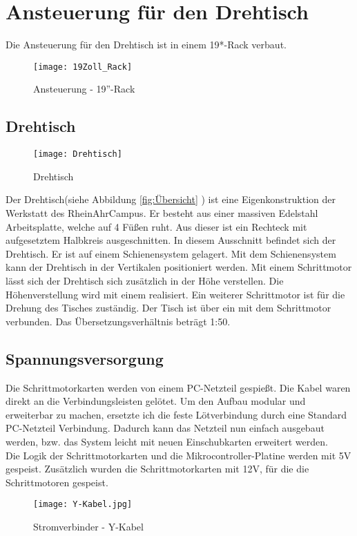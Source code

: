 \section{Ansteuerung für den Drehtisch}
Die Ansteuerung für den Drehtisch ist in einem 19*-Rack verbaut.
\begin{figure}[htb]
\centering
\texttt{[image: 19Zoll\_Rack]}
\caption{Ansteuerung - 19''-Rack}
\label{fig:19Zoll_Rack}
\end{figure}
\subsection{Drehtisch}
\begin{figure}[htb]
\centering
\texttt{[image: Drehtisch]}
\caption{Drehtisch}
\label{fig:Drehtisch}
\end{figure}
Der Drehtisch(siehe Abbildung \ref{fig:Übersicht} ) ist eine Eigenkonstruktion der Werkstatt des RheinAhrCampus. Er besteht aus einer massiven Edelstahl Arbeitsplatte, welche auf 4 Füßen ruht. Aus dieser ist ein Rechteck mit aufgesetztem Halbkreis ausgeschnitten. In diesem Ausschnitt befindet sich der Drehtisch. Er ist auf einem Schienensystem gelagert. Mit dem Schienensystem kann der Drehtisch in der Vertikalen positioniert werden. Mit einem Schrittmotor lässt sich der Drehtisch sich zusätzlich in der Höhe verstellen. Die Höhenverstellung wird mit einem  realisiert. Ein weiterer Schrittmotor ist für die Drehung des Tisches zuständig. Der Tisch ist über ein  mit dem Schrittmotor verbunden. Das Übersetzungsverhältnis beträgt 1:50.   
\subsection{Spannungsversorgung}
Die Schrittmotorkarten werden von einem PC-Netzteil gespießt. Die Kabel waren direkt an die Verbindungsleisten gelötet. Um den Aufbau modular und erweiterbar zu machen, ersetzte ich die feste Lötverbindung durch eine Standard PC-Netzteil Verbindung. Dadurch kann das Netzteil nun einfach ausgebaut werden, bzw. das System leicht mit neuen Einschubkarten erweitert werden.\\
Die Logik der Schrittmotorkarten und die Mikrocontroller-Platine werden mit 5V gespeist. Zusätzlich wurden die Schrittmotorkarten mit 12V, für die die Schrittmotoren gespeist.
\begin{figure}[htb]
\centering
\texttt{[image: Y-Kabel.jpg]}
\caption{Stromverbinder - Y-Kabel}
\label{fig:Y-Kabel}
\end{figure}
